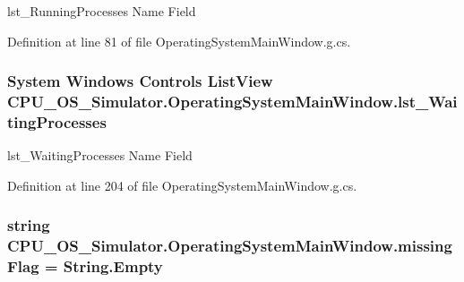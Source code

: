 lst\+\_\+\+Running\+Processes Name Field 



Definition at line 81 of file Operating\+System\+Main\+Window.\+g.\+cs.

\hypertarget{class_c_p_u___o_s___simulator_1_1_operating_system_main_window_a70185c0d33e102e203d76b79ac5c77db}{}
\subsubsection[{lst\+\_\+\+Waiting\+Processes}]{\setlength{\rightskip}{0pt plus 5cm}System Windows Controls List\+View C\+P\+U\+\_\+\+O\+S\+\_\+\+Simulator.\+Operating\+System\+Main\+Window.\+lst\+\_\+\+Waiting\+Processes}\label{class_c_p_u___o_s___simulator_1_1_operating_system_main_window_a70185c0d33e102e203d76b79ac5c77db}


lst\+\_\+\+Waiting\+Processes Name Field 



Definition at line 204 of file Operating\+System\+Main\+Window.\+g.\+cs.

\hypertarget{class_c_p_u___o_s___simulator_1_1_operating_system_main_window_ad3dd5030de453dd97f236e7677ab6732}{}
\subsubsection[{missing\+Flag}]{\setlength{\rightskip}{0pt plus 5cm}string C\+P\+U\+\_\+\+O\+S\+\_\+\+Simulator.\+Operating\+System\+Main\+Window.\+missing\+Flag = String.\+Empty\hspace{0.3cm}{\ttfamily [private]}}\label{class_c_p_u___o_s___simulator_1_1_operating_system_main_window_ad3dd5030de453dd97f236e7677ab6732}


